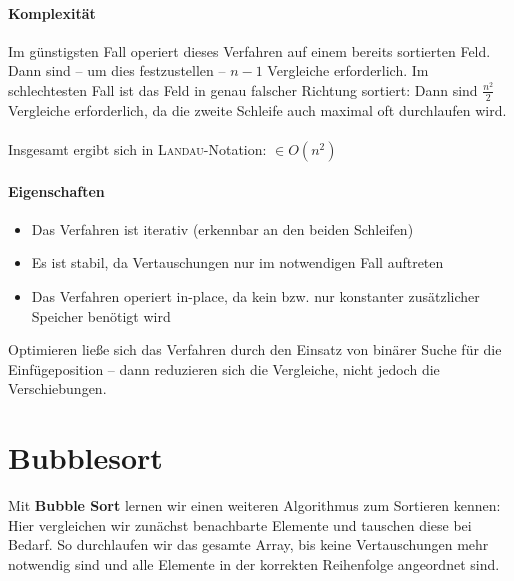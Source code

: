 \documentclass[11pt,a4paper]{scrartcl}
\begin{document}
\paragraph{Komplexität}
Im günstigsten Fall operiert dieses Verfahren auf einem bereits sortierten Feld. Dann sind -- um dies festzustellen -- $n-1$ Vergleiche erforderlich. Im schlechtesten Fall ist das Feld in genau falscher Richtung sortiert: Dann sind $\frac{n^{2}}{2}$ Vergleiche erforderlich, da die zweite Schleife auch maximal oft durchlaufen wird. \\\\
Insgesamt ergibt sich in \textsc{Landau}-Notation: $\in O(n^{2})$
\paragraph{Eigenschaften}
\begin{itemize}
\item Das Verfahren ist iterativ (erkennbar an den beiden Schleifen)
\item Es ist stabil, da Vertauschungen nur im notwendigen Fall auftreten
\item Das Verfahren operiert in-place, da kein bzw. nur konstanter zusätzlicher Speicher benötigt wird
\end{itemize}

Optimieren ließe sich das Verfahren durch den Einsatz von binärer Suche für die Einfügeposition -- dann reduzieren sich die Vergleiche, nicht jedoch die Verschiebungen.
\section{Bubblesort}
Mit \textbf{Bubble Sort} lernen wir einen weiteren Algorithmus zum Sortieren kennen: Hier vergleichen wir zunächst benachbarte Elemente und tauschen diese bei Bedarf. So durchlaufen wir das gesamte Array, bis keine Vertauschungen mehr notwendig sind und alle Elemente in der korrekten Reihenfolge angeordnet sind.
\end{document}
